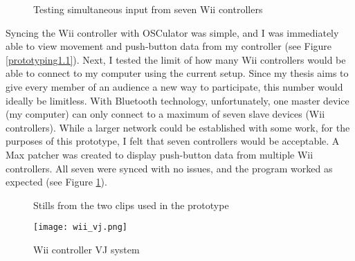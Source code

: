 \begin{figure}
	\centering

	\hspace{0.1cm}
	\caption{Testing simultaneous input from seven Wii controllers}

	\label{prototyping1.2}
\end{figure}

Syncing the Wii controller with OSCulator was simple, and I was immediately able to view movement and push-button data from my controller (see Figure \ref{prototyping1.1}). Next, I tested the limit of how many Wii controllers would be able to connect to my computer using the current setup. Since my thesis aims to give every member of an audience a new way to participate, this number would ideally be limitless. With Bluetooth technology, unfortunately, one master device (my computer) can only connect to a maximum of seven slave devices (Wii controllers). While a larger network could be established with some work, for the purposes of this prototype, I felt that seven controllers would be acceptable. A Max patcher was created to display push-button data from multiple Wii controllers. All seven were synced with no issues, and the program worked as expected (see Figure \ref{prototyping1.2}).

\begin{figure}
	\centering

	\hspace{0.1cm}
	\caption{Stills from the two clips used in the prototype}

	\label{prototyping1.3}
\end{figure}

\begin{figure}
	\centering

	\texttt{[image: wii\_vj.png]}
	\caption{Wii controller VJ system}

	\label{prototyping1.4}
\end{figure}

